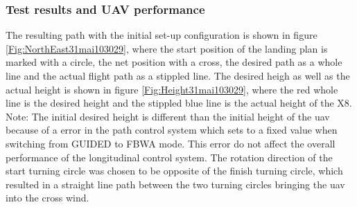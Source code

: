 \subsubsection{Test results and UAV performance}
The resulting path with the initial set-up configuration is shown in figure \ref{Fig:NorthEast31mai103029}, where the start position of the landing plan is marked with a circle, the net position with a cross, the desired path as a whole line and the actual flight path as a stippled line. The desired heigh as well as the actual height is shown in figure \ref{Fig:Height31mai103029}, where the red whole line is the desired height and the stippled blue line is the actual height of the X8. Note: The initial desired height is different than the initial height of the \gls{uav} because of a error in the path control system which sets to a fixed  value when switching from GUIDED to FBWA mode. This error do not affect the overall performance of the longitudinal control system. The rotation direction of the start turning circle was chosen to be opposite of the finish turning circle, which resulted in a straight line path between the two turning circles bringing the \gls{uav} into the cross wind.
\newpage
